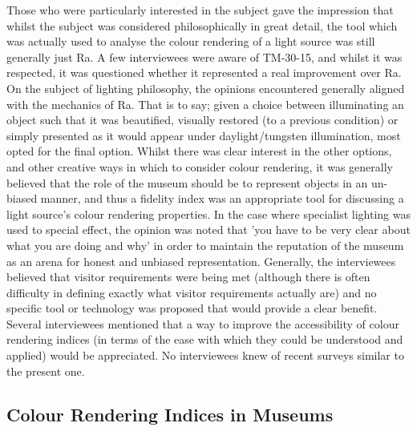 Those who were particularly interested in the subject gave the impression that whilst the subject was considered philosophically in great detail, the tool which was actually used to analyse the colour rendering of a light source was still generally just Ra. A few interviewees were aware of TM-30-15, and whilst it was respected, it was questioned whether it represented a real improvement over Ra.
On the subject of lighting philosophy, the opinions encountered generally aligned with the mechanics of Ra. That is to say; given a choice between illuminating an object such that it was beautified, visually restored (to a previous condition) or simply presented as it would appear under daylight/tungsten illumination, most opted for the final option. Whilst there was clear interest in the other options, and other creative ways in which to consider colour rendering, it was generally believed that the role of the museum should be to represent objects in an un-biased manner, and thus a fidelity index was an appropriate tool for discussing a light source's colour rendering properties. In the case where specialist lighting was used to special effect, the opinion was noted that 'you have to be very clear about what you are doing and why' in order to maintain the reputation of the museum as an arena for honest and unbiased representation.
Generally, the interviewees believed that visitor requirements were being met (although there is often difficulty in defining exactly what visitor requirements actually are) and no specific tool or technology was proposed that would provide a clear benefit. Several interviewees mentioned that a way to improve the accessibility of colour rendering indices (in terms of the ease with which they could be understood and applied) would be appreciated.
No interviewees knew of recent surveys similar to the present one.



\subsection{Colour Rendering Indices in Museums}

